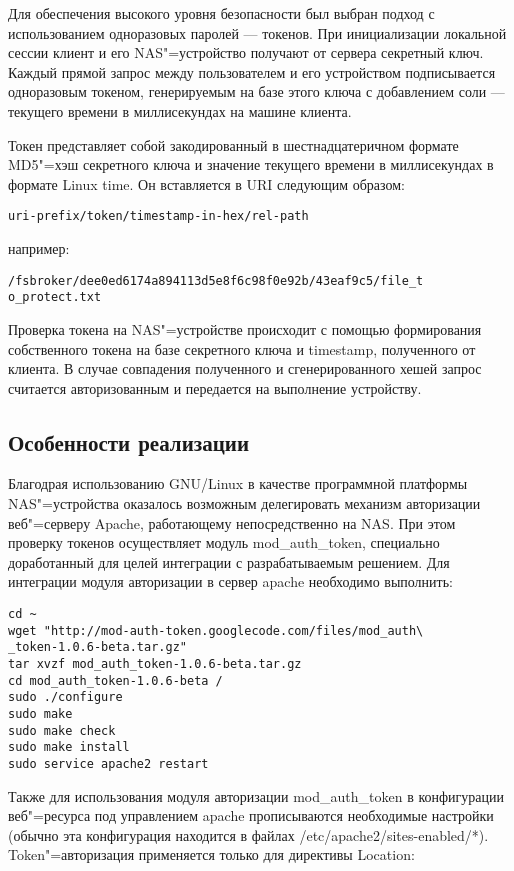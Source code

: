 \documentclass[10pt, a5paper]{article}
\begin{document}
Для обеспечения высокого уровня безопасности был выбран подход с использованием одноразовых паролей --- токенов. При инициализации локальной сессии клиент и его NAS"=устройство получают от сервера секретный ключ. Каждый прямой запрос между пользователем и его устройством подписывается одноразовым токеном, генерируемым на базе этого ключа с добавлением соли --- текущего времени в миллисекундах на машине клиента.

Токен представляет собой закодированный в шестнадцатеричном формате MD5"=хэш секретного ключа и значение текущего времени в миллисекундах в формате Linux time. Он вставляется в URI следующим образом:

\begin{verbatim}
uri-prefix/token/timestamp-in-hex/rel-path\end{verbatim}
например:

\begin{verbatim}
/fsbroker/dee0ed6174a894113d5e8f6c98f0e92b/43eaf9c5/file_t
o_protect.txt\end{verbatim}
Проверка токена на NAS"=устройстве происходит с помощью формирования собственного токена на базе секретного ключа и timestamp, полученного от клиента. В случае совпадения полученного и сгенерированного хешей запрос считается авторизованным и передается на выполнение устройству.

\subsection*{Особенности реализации}

Благодрая использованию GNU/Linux в качестве программной платформы NAS"=устройства оказалось возможным делегировать механизм авторизации веб"=серверу Apache, работающему непосредственно на NAS. При этом проверку токенов осуществляет модуль mod\_auth\_token, специально доработанный для целей интеграции с разрабатываемым решением. 
Для интеграции модуля авторизации в сервер apache необходимо выполнить:

\begin{verbatim}
cd ~ 
wget "http://mod-auth-token.googlecode.com/files/mod_auth\
_token-1.0.6-beta.tar.gz" 
tar xvzf mod_auth_token-1.0.6-beta.tar.gz 
cd mod_auth_token-1.0.6-beta / 
sudo ./configure 
sudo make 
sudo make check 
sudo make install 
sudo service apache2 restart \end{verbatim}
Также для использования модуля авторизации mod\_auth\_token в конфигурации веб"=ресурса под управлением apache прописываются необходимые настройки (обычно эта конфигурация находится в файлах /etc/apache2/sites-enabled/*). Token"=авторизация применяется только для директивы Location:
\end{document}
